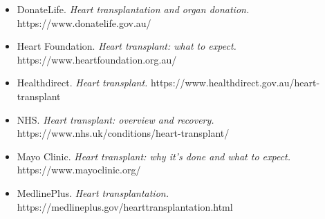 \begin{itemize}
    \item DonateLife. \textit{Heart transplantation and organ donation.} https://www.donatelife.gov.au/
    \item Heart Foundation. \textit{Heart transplant: what to expect.} https://www.heartfoundation.org.au/
    \item Healthdirect. \textit{Heart transplant.} https://www.healthdirect.gov.au/heart-transplant
    \item NHS. \textit{Heart transplant: overview and recovery.} https://www.nhs.uk/conditions/heart-transplant/
    \item Mayo Clinic. \textit{Heart transplant: why it's done and what to expect.} https://www.mayoclinic.org/
    \item MedlinePlus. \textit{Heart transplantation.} https://medlineplus.gov/hearttransplantation.html
\end{itemize}
